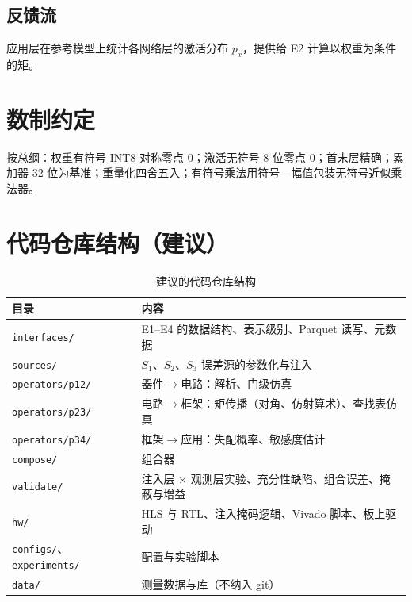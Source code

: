 \documentclass[11pt,a4paper]{ctexart}
\begin{document}
\subsection{反馈流}
应用层在参考模型上统计各网络层的激活分布 $p_x$，提供给 E2 计算以权重为条件的矩。

\section{数制约定}
按总纲：权重有符号 INT8 对称零点 0；激活无符号 8 位零点 0；首末层精确；累加器 32 位为基准；重量化四舍五入；有符号乘法用符号—幅值包装无符号近似乘法器。

\section{代码仓库结构（建议）}
\begin{table}[h]
\centering
\small
\begin{tabularx}{\textwidth}{@{}lX@{}}
\toprule
目录 & 内容 \\
\midrule
\texttt{interfaces/} & E1--E4 的数据结构、表示级别、Parquet 读写、元数据 \\
\texttt{sources/} & $S_1$、$S_2$、$S_3$ 误差源的参数化与注入 \\
\texttt{operators/p12/} & 器件$\to$电路：解析、门级仿真 \\
\texttt{operators/p23/} & 电路$\to$框架：矩传播（对角、仿射算术）、查找表仿真 \\
\texttt{operators/p34/} & 框架$\to$应用：失配概率、敏感度估计 \\
\texttt{compose/} & 组合器 \\
\texttt{validate/} & 注入层 $\times$ 观测层实验、充分性缺陷、组合误差、掩蔽与增益 \\
\texttt{hw/} & HLS 与 RTL、注入掩码逻辑、Vivado 脚本、板上驱动 \\
\texttt{configs/}、\texttt{experiments/} & 配置与实验脚本 \\
\texttt{data/} & 测量数据与库（不纳入 git） \\
\bottomrule
\end{tabularx}
\caption{建议的代码仓库结构}
\end{table}
\end{document}
